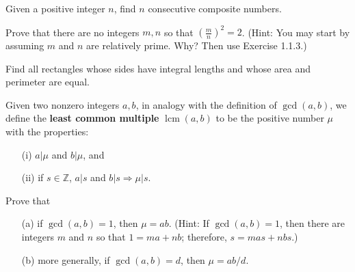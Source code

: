   \begin{exercise}[Shifrin 1.2.10]
    Given a positive integer $n$, find $n$ consecutive composite numbers.
  \end{exercise}

  \begin{exercise}[Shifrin 1.2.11]
    Prove that there are no integers $m, n$ so that $(\frac{m}{n})^2 = 2$. (Hint: You may start by assuming $m$ and $n$ are relatively prime. Why? Then use Exercise 1.1.3.)
  \end{exercise}

  \begin{exercise}[Shifrin 1.2.12]
    Find all rectangles whose sides have integral lengths and whose area and perimeter are equal.
  \end{exercise}

  \begin{exercise}[Shifrin 1.2.13]
    Given two nonzero integers $a, b$, in analogy with the definition of $\gcd(a, b)$, we define the \textbf{least common multiple} $\operatorname{lcm}(a, b)$ to be the positive number $\mu$ with the properties:
    \begin{enumerate}
      \item[(i)] $a|\mu$ and $b|\mu$, and
      \item[(ii)] if $s \in \mathbb{Z}$, $a|s$ and $b|s \Rightarrow \mu|s$.
    \end{enumerate}
    Prove that
    \begin{enumerate}
      \item[(a)] if $\gcd(a, b) = 1$, then $\mu = ab$. (Hint: If $\gcd(a, b) = 1$, then there are integers $m$ and $n$ so that $1 = ma + nb$; therefore, $s = mas + nbs$.)
      \item[(b)] more generally, if $\gcd(a, b) = d$, then $\mu = ab/d$.
    \end{enumerate}
  \end{exercise}
